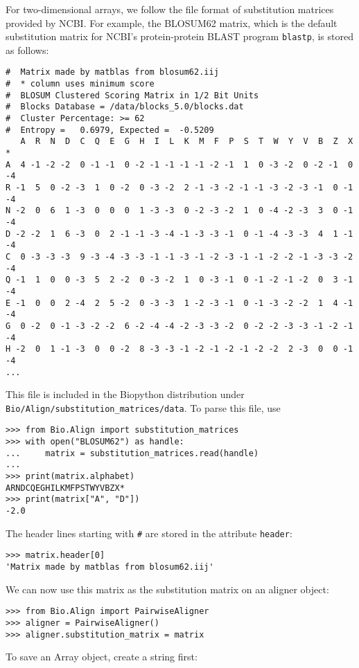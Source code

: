 For two-dimensional arrays, we follow the file format of substitution matrices provided by NCBI. For example, the BLOSUM62 matrix, which is the default substitution matrix for NCBI's protein-protein BLAST \cite{altschul1990} program \verb+blastp+, is stored as follows:
\begin{verbatim}
#  Matrix made by matblas from blosum62.iij
#  * column uses minimum score
#  BLOSUM Clustered Scoring Matrix in 1/2 Bit Units
#  Blocks Database = /data/blocks_5.0/blocks.dat
#  Cluster Percentage: >= 62
#  Entropy =   0.6979, Expected =  -0.5209
   A  R  N  D  C  Q  E  G  H  I  L  K  M  F  P  S  T  W  Y  V  B  Z  X  *
A  4 -1 -2 -2  0 -1 -1  0 -2 -1 -1 -1 -1 -2 -1  1  0 -3 -2  0 -2 -1  0 -4
R -1  5  0 -2 -3  1  0 -2  0 -3 -2  2 -1 -3 -2 -1 -1 -3 -2 -3 -1  0 -1 -4
N -2  0  6  1 -3  0  0  0  1 -3 -3  0 -2 -3 -2  1  0 -4 -2 -3  3  0 -1 -4
D -2 -2  1  6 -3  0  2 -1 -1 -3 -4 -1 -3 -3 -1  0 -1 -4 -3 -3  4  1 -1 -4
C  0 -3 -3 -3  9 -3 -4 -3 -3 -1 -1 -3 -1 -2 -3 -1 -1 -2 -2 -1 -3 -3 -2 -4
Q -1  1  0  0 -3  5  2 -2  0 -3 -2  1  0 -3 -1  0 -1 -2 -1 -2  0  3 -1 -4
E -1  0  0  2 -4  2  5 -2  0 -3 -3  1 -2 -3 -1  0 -1 -3 -2 -2  1  4 -1 -4
G  0 -2  0 -1 -3 -2 -2  6 -2 -4 -4 -2 -3 -3 -2  0 -2 -2 -3 -3 -1 -2 -1 -4
H -2  0  1 -1 -3  0  0 -2  8 -3 -3 -1 -2 -1 -2 -1 -2 -2  2 -3  0  0 -1 -4
...
\end{verbatim}
This file is included in the Biopython distribution under \verb+Bio/Align/substitution_matrices/data+. To parse this file, use

\begin{verbatim}
>>> from Bio.Align import substitution_matrices
>>> with open("BLOSUM62") as handle:
...     matrix = substitution_matrices.read(handle)
...
>>> print(matrix.alphabet)
ARNDCQEGHILKMFPSTWYVBZX*
>>> print(matrix["A", "D"])
-2.0
\end{verbatim}
The header lines starting with \verb+#+ are stored in the attribute \verb+header+:

\begin{verbatim}
>>> matrix.header[0]
'Matrix made by matblas from blosum62.iij'
\end{verbatim}
We can now use this matrix as the substitution matrix on an aligner object:

\begin{verbatim}
>>> from Bio.Align import PairwiseAligner
>>> aligner = PairwiseAligner()
>>> aligner.substitution_matrix = matrix
\end{verbatim}
To save an Array object, create a string first:

